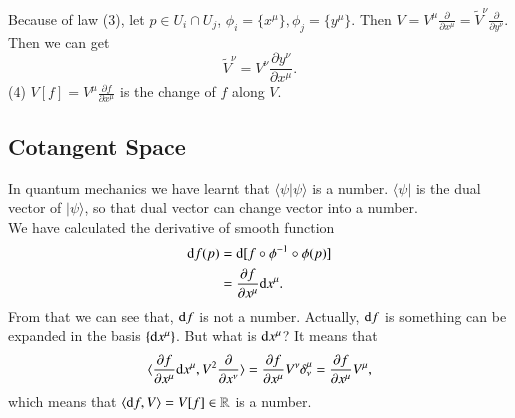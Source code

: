 \documentclass[openany,10pt]{book}
\theoremstyle{definition}
\theoremstyle{definition}
\theoremstyle{remark}
\begin{document}
Because of law (3), let $p\in U_i\cap U_j$, $\phi_i=\{x^\mu\},\phi_j=\{y^\mu\}$. Then $V=V^\mu\frac{\partial}{\partial x^\mu}=\tilde{V}^\nu\frac{\partial}{\partial y^\nu}$. Then we can get 
\begin{equation}
    \tilde{V}^\nu=V^\nu\frac{\partial y^\nu}{\partial x^\mu}.
\end{equation}
(4) $V[f]=V^\mu\frac{\partial f}{\partial x^\mu}$ is the change of $f$ along $V$.

\subsection{Cotangent Space}
In quantum mechanics we have learnt that $\langle\psi|\psi\rangle$ is a number. $\langle\psi|$ is the dual vector of $|\psi\rangle$, so that dual vector can change vector into a number.\\
We have calculated the derivative of smooth function 
\begin{equation}
    \begin{aligned}
        {\rm{d}}f(p)&={\rm{d}}[f\circ\phi^{-1}\circ\phi(p)]\\
        &=\frac{\partial f}{\partial x^\mu}{\rm{d}}x^\mu.
    \end{aligned}
\end{equation}
From that we can see that, ${\rm{d}}f$ is not a number. Actually, ${\rm{d}}f$ is something can be expanded in the basis $\{{\rm{d}}x^\mu\}$. But what is ${\rm{d}}x^\mu$? 
It means that 
\begin{equation}
    \langle\frac{\partial f}{\partial x^\mu}{\rm{d}}x^\mu,V^2\frac{\partial}{\partial x^\nu}\rangle=\frac{\partial f}{\partial x^\mu}V^\nu\delta^\mu_\nu=\frac{\partial f}{\partial x^\mu}V^\mu,
\end{equation}
which means that $\langle{\rm{d}}f,V\rangle=V[f]\in\mathbb{R}$ is a number.\\
\end{document}
